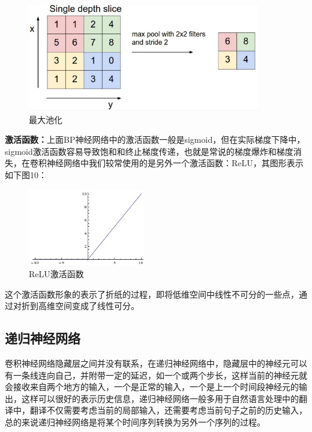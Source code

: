 \documentclass{article} %
\begin{document}
\begin{CJK*}{UTF8}{gkai}
\begin{figure}[h]
\begin{center}

\includegraphics[width=4in]{9.png}

\end{center}
\caption{最大池化}
\end{figure}

\textbf{激活函数：}上面BP神经网络中的激活函数一般是sigmoid，但在实际梯度下降中，sigmoid激活函数容易导致饱和和终止梯度传递，也就是常说的梯度爆炸和梯度消失，在卷积神经网络中我们较常使用的是另外一个激活函数：ReLU，其图形表示如下图10：

\begin{figure}[h]
\begin{center}

\includegraphics[width=2in]{10.png}

\end{center}
\caption{ReLU激活函数}
\end{figure}

这个激活函数形象的表示了折纸的过程，即将低维空间中线性不可分的一些点，通过对折到高维空间变成了线性可分。
\subsection{递归神经网络}
卷积神经网络隐藏层之间并没有联系，在递归神经网络中，隐藏层中的神经元可以有一条线连向自己，并附带一定的延迟，如一个或两个步长，这样当前的神经元就会接收来自两个地方的输入，一个是正常的输入，一个是上一个时间段神经元的输出，这样可以很好的表示历史信息，递归神经网络一般多用于自然语言处理中的翻译中，翻译不仅需要考虑当前的局部输入，还需要考虑当前句子之前的历史输入，总的来说递归神经网络是将某个时间序列转换为另外一个序列的过程。


\end{CJK*}
\end{document}

